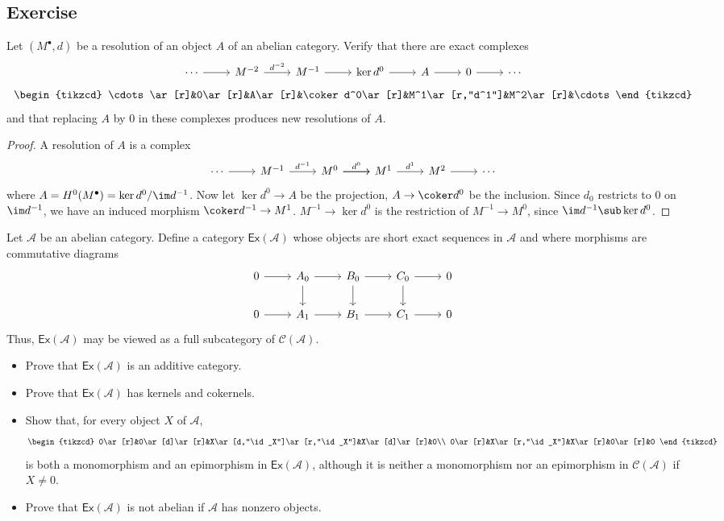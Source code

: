 \subsection{Exercise}
\begin{exercise}
Let $(M^\bullet,d)$ be a resolution of an object $A$ of an abelian category. Verify that there are exact complexes
\[\begin{tikzcd}
\cdots\ar[r]&M^{-2}\ar[r,"d^{-2}"]&M^{-1}\ar[r]&\ker d^0\ar[r]&A\ar[r]&0\ar[r]&\cdots
\end{tikzcd}\]
\[\begin{tikzcd}
\cdots\ar[r]&0\ar[r]&A\ar[r]&\coker d^0\ar[r]&M^1\ar[r,"d^1"]&M^2\ar[r]&\cdots
\end{tikzcd}\]
and that replacing $A$ by $0$ in these complexes produces new resolutions of $A$.
\end{exercise}
\begin{proof}
A resolution of $A$ is a complex
\[\begin{tikzcd}
\cdots\ar[r]&M^{-1}\ar[r,"d^{-1}"]&M^0\ar[r,"d^0"]\ar[r]&M^1\ar[r,"d^1"]&M^2\ar[r]&\cdots
\end{tikzcd}\]
where $A=H^0(M^\bullet)=\ker d^0/\im d^{-1}$. Now let $\ker d^0\to A$ be the projection, $A\to\coker d^0$ be the inclusion. Since $d_0$ restricts to $0$ on $\im d^{-1}$, we have an induced morphism $\coker d^{-1}\to M^1$. $M^{-1}\to\ker d^0$ is the restriction of $M^{-1}\to M^0$, since $\im d^{-1}\sub\ker d^0$.
\end{proof}
\begin{exercise}
Let $\mathcal{A}$ be an abelian category. Define a category $\mathsf{Ex}(\mathcal{A})$ whose objects are short exact sequences in $\mathcal{A}$ and where morphisms are commutative diagrams
\[\begin{tikzcd}
0\ar[r]&A_0\ar[d]\ar[r]&B_0\ar[r]\ar[d]&C_0\ar[d]\ar[r]&0\\
0\ar[r]&A_1\ar[r]&B_1\ar[r]&C_1\ar[r]&0
\end{tikzcd}\]
Thus, $\mathsf{Ex}(\mathcal{A})$ may be viewed as a full subcategory of $\mathcal{C}(\mathcal{A})$.
\begin{itemize}
\item Prove that $\mathsf{Ex}(\mathcal{A})$ is an additive category.
\item Prove that $\mathsf{Ex}(\mathcal{A})$ has kernels and cokernels.
\item Show that, for every object $X$ of $\mathcal{A}$,
\[\begin{tikzcd}
0\ar[r]&0\ar[d]\ar[r]&X\ar[d,"\id_X"]\ar[r,"\id_X"]&X\ar[d]\ar[r]&0\\
0\ar[r]&X\ar[r,"\id_X"]&X\ar[r]&0\ar[r]&0
\end{tikzcd}\]
is both a monomorphism and an epimorphism in $\mathsf{Ex}(\mathcal{A})$, although it is neither a monomorphism nor an epimorphism in $\mathcal{C}(\mathcal{A})$ if 
$X\neq0$.
\item Prove that $\mathsf{Ex}(\mathcal{A})$ is not abelian if $\mathcal{A}$ has nonzero objects.
\end{itemize}
\end{exercise}
